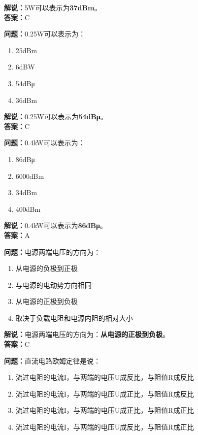 \documentclass{ctexbook}
\begin{document}
\noindent\textbf{解说：}5W可以表示为\textbf{37dBm}。\\\noindent\textbf{答案：}C %


\bigskip


\noindent\textbf{问题：}0.25W可以表示为：

\begin{enumerate}[label=\Alph*), leftmargin=3em]
	\item 25dBm
	\item 6dBW
	\item 54dBμ
	\item 36dBm
\end{enumerate}

\noindent\textbf{解说：}0.25W可以表示为\textbf{54dBμ}。\\\noindent\textbf{答案：}C%


\bigskip


\noindent\textbf{问题：}0.4kW可以表示为：

\begin{enumerate}[label=\Alph*), leftmargin=3em]
	\item 86dBμ
	\item 6000dBm
	\item 34dBm
	\item 400dBm
\end{enumerate}

\noindent\textbf{解说：}0.4kW可以表示为\textbf{86dBμ}。\\\noindent\textbf{答案：}A%


\bigskip


\noindent\textbf{问题：}电源两端电压的方向为：

\begin{enumerate}[label=\Alph*), leftmargin=3em]
	\item 从电源的负极到正极
	\item 与电源的电动势方向相同
	\item 从电源的正极到负极
	\item 取决于负载电阻和电源内阻的相对大小
\end{enumerate}

\noindent\textbf{解说：}电源两端电压的方向为：\textbf{从电源的正极到负极}。\\\noindent\textbf{答案：}C


\bigskip


\noindent\textbf{问题：}直流电路欧姆定律是说：

\begin{enumerate}[label=\Alph*), leftmargin=3em]
	\item 流过电阻的电流I，与两端的电压U成反比，与阻值R成反比
	\item 流过电阻的电流I，与两端的电压U成正比，与阻值R成反比
	\item 流过电阻的电流I，与两端的电压U成正比，与阻值R成正比
	\item 流过电阻的电流I，与两端的电压U成反比，与阻值R成正比
\end{enumerate}
\end{document}
